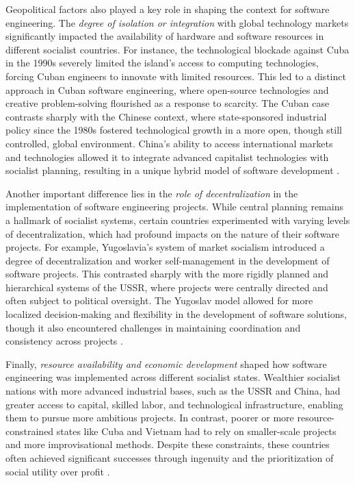 \begin{refsection}
Geopolitical factors also played a key role in shaping the context for software engineering. The \textit{degree of isolation or integration} with global technology markets significantly impacted the availability of hardware and software resources in different socialist countries. For instance, the technological blockade against Cuba in the 1990s severely limited the island’s access to computing technologies, forcing Cuban engineers to innovate with limited resources. This led to a distinct approach in Cuban software engineering, where open-source technologies and creative problem-solving flourished as a response to scarcity. The Cuban case contrasts sharply with the Chinese context, where state-sponsored industrial policy since the 1980s fostered technological growth in a more open, though still controlled, global environment. China's ability to access international markets and technologies allowed it to integrate advanced capitalist technologies with socialist planning, resulting in a unique hybrid model of software development \cite[pp.~23-29]{harrell2011}.

Another important difference lies in the \textit{role of decentralization} in the implementation of software engineering projects. While central planning remains a hallmark of socialist systems, certain countries experimented with varying levels of decentralization, which had profound impacts on the nature of their software projects. For example, Yugoslavia's system of market socialism introduced a degree of decentralization and worker self-management in the development of software projects. This contrasted sharply with the more rigidly planned and hierarchical systems of the USSR, where projects were centrally directed and often subject to political oversight. The Yugoslav model allowed for more localized decision-making and flexibility in the development of software solutions, though it also encountered challenges in maintaining coordination and consistency across projects \cite[pp.~53-58]{djilas1957}.

Finally, \textit{resource availability and economic development} shaped how software engineering was implemented across different socialist states. Wealthier socialist nations with more advanced industrial bases, such as the USSR and China, had greater access to capital, skilled labor, and technological infrastructure, enabling them to pursue more ambitious projects. In contrast, poorer or more resource-constrained states like Cuba and Vietnam had to rely on smaller-scale projects and more improvisational methods. Despite these constraints, these countries often achieved significant successes through ingenuity and the prioritization of social utility over profit \cite[pp.~95-100]{klein2019}. 


\end{refsection}
